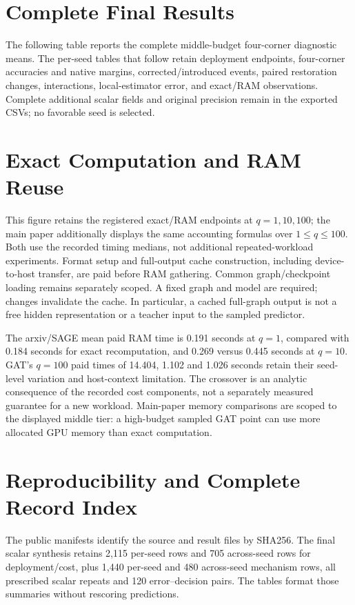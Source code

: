 \documentclass[11pt]{article}
\begin{document}



\section{Complete Final Results}
\label{sec:supp-final}
The following table reports the complete middle-budget four-corner diagnostic means. The per-seed tables that follow retain deployment endpoints, four-corner accuracies and native margins, corrected/introduced events, paired restoration changes, interactions, local-estimator error, and exact/RAM observations. Complete additional scalar fields and original precision remain in the exported CSVs; no favorable seed is selected.

\clearpage


\section{Exact Computation and RAM Reuse}
This figure retains the registered exact/RAM endpoints at $q=1,10,100$; the main paper additionally displays the same accounting formulas over $1\leq q\leq100$. Both use the recorded timing medians, not additional repeated-workload experiments. Format setup and full-output cache construction, including device-to-host transfer, are paid before RAM gathering. Common graph/checkpoint loading remains separately scoped. A fixed graph and model are required; changes invalidate the cache. In particular, a cached full-graph output is not a free hidden representation or a teacher input to the sampled predictor.

The arxiv/SAGE mean paid RAM time is 0.191 seconds at $q=1$, compared with 0.184 seconds for exact recomputation, and 0.269 versus 0.445 seconds at $q=10$. GAT's $q=100$ paid times of 14.404, 1.102 and 1.026 seconds retain their seed-level variation and host-context limitation. The crossover is an analytic consequence of the recorded cost components, not a separately measured guarantee for a new workload. Main-paper memory comparisons are scoped to the displayed middle tier: a high-budget sampled GAT point can use more allocated GPU memory than exact computation.

\FinalCacheFigure
\clearpage



\section{Reproducibility and Complete Record Index}
The public manifests identify the source and result files by SHA256. The final scalar synthesis retains 2,115 per-seed rows and 705 across-seed rows for deployment/cost, plus 1,440 per-seed and 480 across-seed mechanism rows, all prescribed scalar repeats and 120 error--decision pairs. The tables format those summaries without rescoring predictions.
\end{document}
